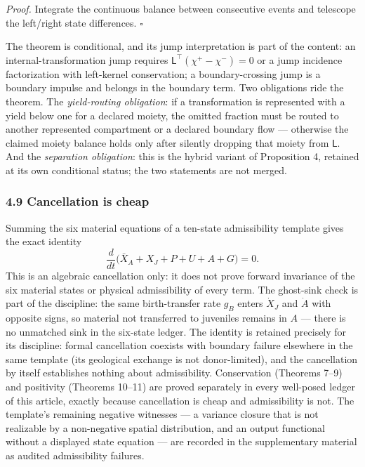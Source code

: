 \documentclass[11pt]{article}
\begin{document}
\emph{Proof.} Integrate the continuous balance between consecutive
events and telescope the left/right state differences. \ensuremath{\square}

The theorem is conditional, and its jump interpretation is part of the
content: an internal-transformation jump requires
\(\mathsf{L}^\top(\chi^+ - \chi^-) = 0\) or a jump incidence
factorization with left-kernel conservation; a boundary-crossing jump is
a boundary impulse and belongs in the boundary term. Two obligations
ride the theorem. The \emph{yield-routing obligation}: if a
transformation is represented with a yield below one for a declared
moiety, the omitted fraction must be routed to another represented
compartment or a declared boundary flow --- otherwise the claimed moiety
balance holds only after silently dropping that moiety from
\(\mathsf{L}\). And the \emph{separation obligation}: this is the hybrid
variant of Proposition 4, retained at its own conditional status; the
two statements are not merged.

\subsubsection{4.9 Cancellation is cheap}\label{cancellation-is-cheap}

Summing the six material equations of a ten-state admissibility template
gives the exact identity
\[\frac{d}{dt}\bigl( \bar X_A + X_J + P + U + A + G \bigr) = 0.\] This
is an algebraic cancellation only: it does not prove forward invariance
of the six material states or physical admissibility of every term. The
ghost-sink check is part of the discipline: the same birth-transfer rate
\(g_B\) enters \(\dot X_J\) and \(\dot A\) with opposite signs, so
material not transferred to juveniles remains in \(A\) --- there is no
unmatched sink in the six-state ledger. The identity is retained
precisely for its discipline: formal cancellation coexists with boundary
failure elsewhere in the same template (its geological exchange is not
donor-limited), and the cancellation by itself establishes nothing about
admissibility. Conservation (Theorems 7--9) and positivity (Theorems
10--11) are proved separately in every well-posed ledger of this
article, exactly because cancellation is cheap and admissibility is not.
The template's remaining negative witnesses --- a variance closure that
is not realizable by a non-negative spatial distribution, and an output
functional without a displayed state equation --- are recorded in the
supplementary material as audited admissibility failures.
\end{document}
